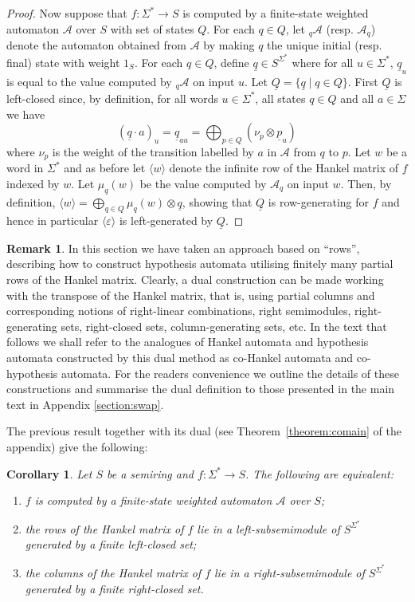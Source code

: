 \documentclass[10pt,a4paper]{amsart}
\newtheorem{cor}[thm]{Corollary}
\theoremstyle{definition}
\newtheorem{rem}[thm]{Remark}
\numberwithin{equation}{section}
\numberwithin{theorem}{section}
\begin{document}
\begin{proof}
	Now suppose that $f:\Sigma^* \to S$ is computed by a finite-state weighted automaton $\mathcal{A}$ over $S$ with set of states $Q$. For each $q \in Q$, let $_q\mathcal{A}$ (resp. $\mathcal{A}_q$) denote the automaton obtained from $\mathcal{A}$ by making $q$ the unique initial (resp. final) state with weight $1_S$. For each $q \in Q$, define $\underline{q} \in S^{\Sigma^*}$ where for all $u \in \Sigma^*$, $\underline{q}_u$ is equal to the value computed by $_q\mathcal{A}$ on input $u$. Let $\underline{Q} = \{\underline{q} \mid q\in Q\}$. First $\underline{Q}$ is left-closed since, by definition, for all words $u\in \Sigma^*$, all states $q \in Q$ and all $a\in \Sigma$ we have
 $$(\underline{q} \cdot a)_u = \underline{q}_{au} = \bigoplus_{p \in Q} (\nu_{p} \otimes \underline{p}_u)$$ where $\nu_p$ is the weight of the transition labelled by $a$ in $\mathcal{A}$ from $q$ to $p$.
	Let $w$ be a word in $\Sigma^*$ and as before let $\langle w \rangle$ denote the infinite row of the Hankel matrix of $f$ indexed by $w$. Let $\mu_{q}(w)$ be the value computed by $\mathcal{A}_q$ on input $w$. Then, by definition, $\langle w \rangle = \bigoplus_{q \in Q} \mu_{q}(w) \otimes \underline{q}$, showing that $\underline{Q}$ is row-generating for $f$ and hence in particular $\langle \varepsilon \rangle$ is left-generated by $\underline{Q}$.
\end{proof}


\begin{rem}
	\label{rem:dual}
	In this section we have taken an approach based on ``rows'', describing how to construct hypothesis automata utilising finitely many partial rows of the Hankel matrix. Clearly, a dual construction can be made working with the transpose of the Hankel matrix, that is, using  partial columns and corresponding notions of right-linear combinations, right semimodules, right-generating sets,  right-closed sets, column-generating sets, etc.  In the text that follows we shall refer to the analogues of Hankel automata and hypothesis automata constructed by this dual method as co-Hankel automata and co-hypothesis automata. For the readers convenience we outline the details of these constructions and summarise the dual definition to those presented in the main text in Appendix \ref{section:swap}. 
\end{rem}

The previous result together with its dual (see Theorem~\ref{theorem:comain} of the appendix) give the following:
\begin{cor}
Let $S$ be a semiring and $f: \Sigma^* \rightarrow S$. The following are equivalent:
\begin{enumerate}
	\item  $f$ is computed by a finite-state weighted automaton $\mathcal{A}$ over $S$;
	\item the rows of the Hankel matrix of $f$ lie in a left-subsemimodule of $S^{\Sigma^*}$ generated by a finite left-closed set;
	\item the columns of the Hankel matrix of $f$ lie in a right-subsemimodule of $S^{\Sigma^*}$ generated by a finite right-closed set.
\end{enumerate}
\end{cor}	
\end{document}
